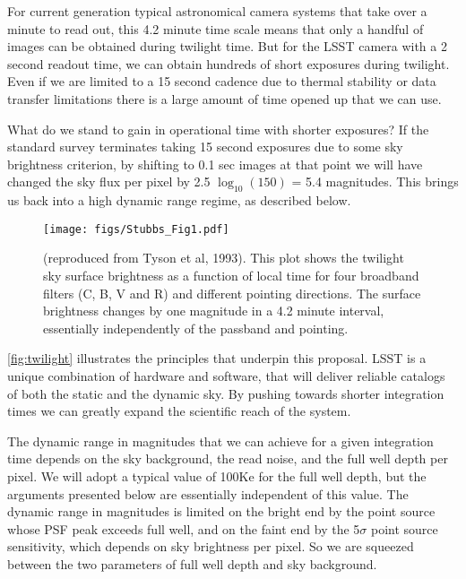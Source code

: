 For current generation typical astronomical camera systems that take
over a minute to read out, this 4.2 minute time scale means that only a
handful of images can be obtained during twilight time. But for the LSST
camera with a 2 second readout time, we can obtain hundreds of short
exposures during twilight. Even if we are limited to a 15 second cadence
due to thermal stability or data transfer limitations there is a large
amount of time opened up that we can use.

What do we stand to gain in operational time with shorter exposures? If
the standard survey terminates taking 15 second exposures due to some
sky brightness criterion, by shifting to 0.1 sec images at that point we
will have changed the sky flux per pixel by 2.5 $\log_{10}(150)$ = 5.4
magnitudes. This brings us back into a high dynamic range regime, as
described below.

\begin{figure}[htbp]
\begin{center}
\texttt{[image: figs/Stubbs\_Fig1.pdf]}
\caption{(reproduced from Tyson et al, 1993). This plot shows the
  twilight sky surface brightness as a function of local time for four
  broadband filters (C, B, V and R) and different pointing directions.
  The surface brightness changes by one magnitude in a 4.2 minute interval,
essentially independently of the passband and pointing.}
\label{fig:Tyson}
\end{center}
\end{figure}

\autoref{fig:twilight} illustrates the principles that underpin this proposal. LSST is
a unique combination of hardware and software, that will deliver
reliable catalogs of both the static and the dynamic sky. By pushing
towards shorter integration times we can greatly expand the scientific
reach of the system.

The dynamic range in magnitudes that we can achieve for a given
integration time depends on the sky background, the read noise, and the
full well depth per pixel. We will adopt a typical value of 100Ke for
the full well depth, but the arguments presented below are essentially
independent of this value. The dynamic range in magnitudes is limited on
the bright end by the point source whose PSF peak exceeds full well, and
on the faint end by the 5$\sigma$ point source sensitivity, which
depends on sky brightness per pixel. So we are squeezed between the two
parameters of full well depth and sky background.


